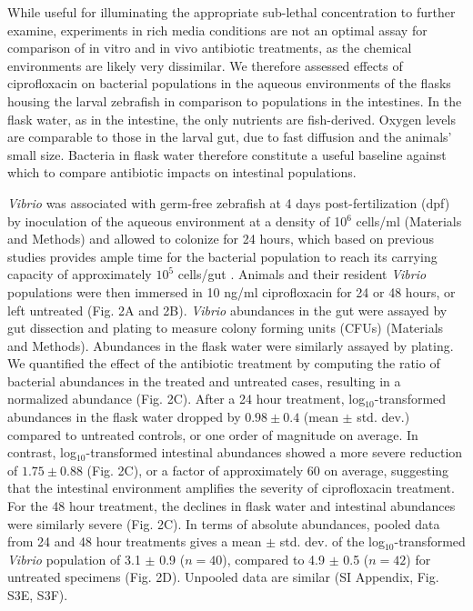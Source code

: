 While useful for illuminating the appropriate sub-lethal concentration to further examine, experiments in rich media conditions are not an optimal assay for comparison of in vitro and in vivo antibiotic treatments, as the chemical environments are likely very dissimilar. We therefore assessed effects of ciprofloxacin on bacterial populations in the aqueous environments of the flasks housing the larval zebrafish in comparison to populations in the intestines. In the flask water, as in the intestine, the only nutrients are fish-derived. Oxygen levels are  comparable to those in the larval gut, due to fast diffusion and the animals' small size. Bacteria in flask water therefore constitute a useful baseline against which to compare antibiotic impacts on intestinal populations.

\textit{Vibrio} was associated with germ-free zebrafish at 4 days post-fertilization (dpf) by inoculation of the aqueous environment at a density of 10$^6$ cells/ml (Materials and Methods) and allowed to colonize for 24 hours, which based on previous studies provides ample time for the bacterial population to reach its carrying capacity of approximately $10^5$ cells/gut \cite{Wiles2016}. Animals and their resident \textit{Vibrio} populations were then immersed in 10 ng/ml ciprofloxacin for 24 or 48 hours, or left untreated (Fig. 2A and 2B). \textit{Vibrio} abundances in the gut were assayed by gut dissection and plating to measure colony forming units (CFUs) (Materials and Methods). Abundances in the flask water were similarly assayed by plating. We quantified the effect of the antibiotic treatment by computing the ratio of bacterial abundances in the treated and untreated cases, resulting in a normalized abundance (Fig. 2C). After a 24 hour treatment, log$_{10}$-transformed abundances in the flask water dropped by $0.98 \pm 0.4$ (mean $\pm$ std. dev.) compared to untreated controls, or one order of magnitude on average. In contrast, log$_{10}$-transformed intestinal abundances showed a more severe reduction of $1.75 \pm 0.88$ (Fig. 2C), or a factor of approximately 60 on average, suggesting that the intestinal environment amplifies the severity of ciprofloxacin treatment. For the 48 hour treatment, the declines in flask water and intestinal abundances were similarly severe (Fig. 2C). In terms of absolute abundances, pooled data from 24 and 48 hour treatments gives a mean $\pm$ std. dev. of the log$_{10}$-transformed \textit{Vibrio} population of 3.1 $\pm$ 0.9 ($n = 40$), compared to 4.9 $\pm$ 0.5 ($n = 42$) for untreated specimens (Fig. 2D). Unpooled data are similar (SI Appendix, Fig. S3E, S3F).  



